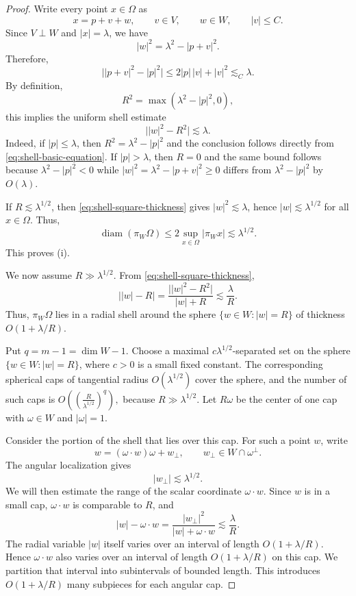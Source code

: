 \documentclass[11pt,reqno]{amsart}
\numberwithin{equation}{section}
\newcommand{\1}{\textbf{1}}
\newcommand{\ls}{\lesssim}
\begin{document}
	
	\begin{proof}
		Write every point $x\in\Omega$ as
		\[
		x=p+v+w,
		\qquad v\in V,
		\qquad w\in W,
		\qquad |v|\le C.
		\]
		Since $V\perp W$ and $|x|=\lambda$, we have
		\begin{equation}\label{eq:shell-basic-equation}
			|w|^2=\lambda^2-|p+v|^2.
		\end{equation}
		Therefore,
		\[
		\bigl||p+v|^2-|p|^2\bigr|
		\le 2|p|\,|v|+|v|^2
		\ls_C \lambda.
		\]
		By definition,
		\[
		R^2=\max(\lambda^2-|p|^2,0),
		\]
		this implies the uniform shell estimate
		\begin{equation}\label{eq:shell-square-thickness}
			\bigl||w|^2-R^2\bigr|\ls\lambda.
		\end{equation}
		Indeed, if $|p|\le\lambda$, then
		$R^2=\lambda^2-|p|^2$ and the conclusion follows directly from
		\eqref{eq:shell-basic-equation}.  If $|p|>\lambda$, then $R=0$ and the same
		bound follows because $\lambda^2-|p|^2<0$ while
		$|w|^2=\lambda^2-|p+v|^2\ge0$ differs from
		$\lambda^2-|p|^2$ by $O(\lambda)$.
		
		If $R\ls\lambda^{1/2}$, then \eqref{eq:shell-square-thickness} gives
		$|w|^2\ls\lambda$, hence $|w|\ls\lambda^{1/2}$ for all $x\in\Omega$.
		Thus,
		\[
		\operatorname{diam}(\pi_W\Omega)
		\le 2\sup_{x\in\Omega}|\pi_Wx|
		\ls\lambda^{1/2}.
		\]
		This proves (i).
		
		We now assume $R\gg\lambda^{1/2}$.  From
		\eqref{eq:shell-square-thickness},
		\[
		\bigl||w|-R\bigr|
		=\frac{\bigl||w|^2-R^2\bigr|}{|w|+R}
		\ls \frac{\lambda}{R}.
		\]
		Thus, $\pi_W\Omega$ lies in a radial shell around the sphere
		$\{w\in W:|w|=R\}$ of thickness $O(1+\lambda/R)$.
		
		Put $q=m-1=\dim W-1$.  Choose a maximal $c\lambda^{1/2}$-separated set on
		the sphere $\{w\in W:|w|=R\}$, where $c>0$ is a small fixed constant. The
		corresponding spherical caps of tangential radius $O(\lambda^{1/2})$ cover
		the sphere, and the number of such caps is
		$	O((\frac{R}{\lambda^{1/2}})^q),$
		because $R\gg\lambda^{1/2}$.  Let $R\omega$ be the center of one cap
		with $\omega\in W$ and $|\omega|=1$.
		
		Consider the portion of the shell that lies over this cap.  For such a point
		$w$, write
		\[
		w=(\omega\cdot w)\omega+w_\perp,
		\qquad w_\perp\in W\cap\omega^\perp.
		\]
		The angular localization gives
		\[
		|w_\perp|\ls\lambda^{1/2}.
		\]
		We will then estimate the range of the scalar coordinate $\omega\cdot w$.  Since
		$w$ is in a small cap, $\omega\cdot w$ is comparable to $R$, and
		\[
		|w|-\omega\cdot w
		=\frac{|w_\perp|^2}{|w|+\omega\cdot w}
		\ls \frac{\lambda}{R}.
		\]
		The radial variable $|w|$ itself varies over an interval of length
		$O(1+\lambda/R)$.  Hence $\omega\cdot w$ also varies over an interval of
		length $O(1+\lambda/R)$
		on this cap.  We partition that interval into subintervals of bounded
		length.  This introduces $O(1+\lambda/R)$ many subpieces for each angular cap.
		

\end{proof}
\end{document}
